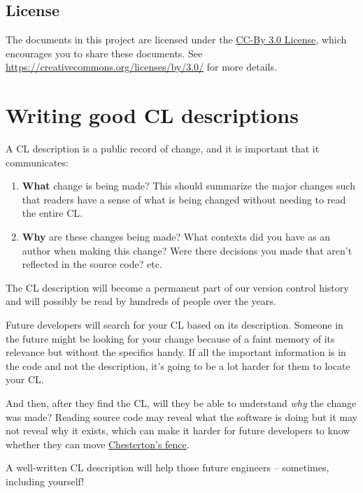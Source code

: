 \documentclass[
]{article}
\begin{document}
\subsection{License}\label{license}

The documents in this project are licensed under the
\href{LICENSE}{CC-By 3.0 License}, which encourages you to share these
documents. See \url{https://creativecommons.org/licenses/by/3.0/} for
more details.

\section{Writing good CL
descriptions}\label{writing-good-cl-descriptions}

A CL description is a public record of change, and it is important that
it communicates:

\begin{enumerate}
\def\labelenumi{\arabic{enumi}.}
\item
  \textbf{What} change is being made? This should summarize the major
  changes such that readers have a sense of what is being changed
  without needing to read the entire CL.
\item
  \textbf{Why} are these changes being made? What contexts did you have
  as an author when making this change? Were there decisions you made
  that aren't reflected in the source code? etc.
\end{enumerate}

The CL description will become a permanent part of our version control
history and will possibly be read by hundreds of people over the years.

Future developers will search for your CL based on its description.
Someone in the future might be looking for your change because of a
faint memory of its relevance but without the specifics handy. If all
the important information is in the code and not the description, it's
going to be a lot harder for them to locate your CL.

And then, after they find the CL, will they be able to understand
\emph{why} the change was made? Reading source code may reveal what the
software is doing but it may not reveal why it exists, which can make it
harder for future developers to know whether they can move
\href{https://abseil.io/resources/swe-book/html/ch03.html\#understand_context}{Chesterton's
fence}.

A well-written CL description will help those future engineers --
sometimes, including yourself!
\end{document}
